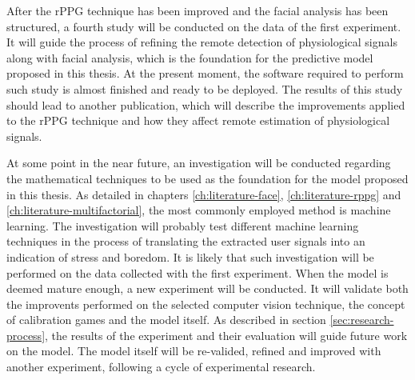 After the rPPG technique has been improved and the facial analysis has been structured, a fourth study will be conducted on the data of the first experiment. It will guide the process of refining the remote detection of physiological signals along with facial analysis, which is the foundation for the predictive model proposed in this thesis. At the present moment, the software required to perform such study is almost finished and ready to be deployed. The results of this study should lead to another publication, which will describe the improvements applied to the rPPG technique and how they affect remote estimation of physiological signals.

At some point in the near future, an investigation will be conducted regarding the mathematical techniques to be used as the foundation for the model proposed in this thesis. As detailed in chapters \ref{ch:literature-face}, \ref{ch:literature-rppg} and \ref{ch:literature-multifactorial}, the most commonly employed method is machine learning. The investigation will probably test different machine learning techniques in the process of translating the extracted user signals into an indication of stress and boredom. It is likely that such investigation will be performed on the data collected with the first experiment. When the model is deemed mature enough, a new experiment will be conducted. It will validate both the improvents performed on the selected computer vision technique, the concept of calibration games and the model itself. As described in section \ref{sec:research-process}, the results of the experiment and their evaluation will guide future work on the model. The model itself will be re-valided, refined and improved with another experiment, following a cycle of experimental research.
